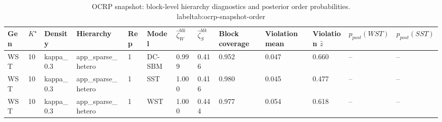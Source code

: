 \begin{table}[!h]
\centering
\caption{OCRP snapshot: block-level hierarchy diagnostics and posterior order probabilities.\\label{tab:ocrp-snapshot-order}}
\centering
\begin{tabular}[t]{lllllllllllll}
\toprule
Gen & $K^\star$ & Density & Hierarchy & Rep & Model & $\widehat\zeta_W^{blk}$ & $\widehat\zeta_S^{blk}$ & Block coverage & Violation mean & Violation $\hat z$ & $p_{post}(WST)$ & $p_{post}(SST)$\\
\midrule
WST & 10 & kappa_0.3 & app_sparse_hetero & 1 & DC-SBM & 0.999 & 0.416 & 0.952 & 0.047 & 0.660 & -- & --\\
WST & 10 & kappa_0.3 & app_sparse_hetero & 1 & SST & 1.000 & 0.416 & 0.980 & 0.045 & 0.477 & -- & --\\
WST & 10 & kappa_0.3 & app_sparse_hetero & 1 & WST & 1.000 & 0.444 & 0.977 & 0.054 & 0.618 & -- & --\\
\bottomrule
\end{tabular}
\end{table}

